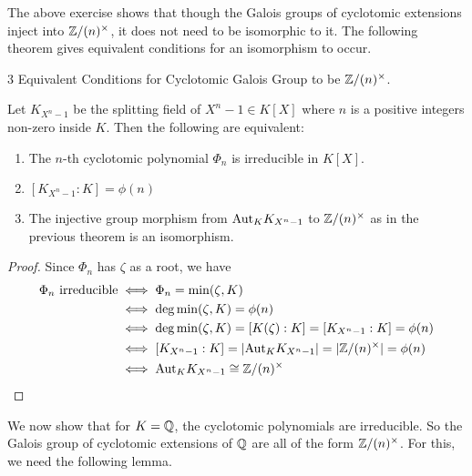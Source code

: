 \documentclass[../book.tex]{subfiles}
\begin{document}
\begin{rmk}
    
    The above exercise shows that
    though the Galois groups of cyclotomic extensions inject into $\mathbb{Z}/(n)^\times$,
    it does not need to be isomorphic to it. 
    The following theorem gives equivalent conditions for an isomorphism to occur.
    
\end{rmk}
\begin{thm} 3 Equivalent Conditions for Cyclotomic Galois Group to be $\mathbb{Z}/(n)^\times$.
    
    Let $K_{X^n - 1}$ be the splitting field of $X^n - 1 \in K[X]$
    where $n$ is a positive integers non-zero inside $K$. 
    Then the following are equivalent: \begin{enumerate}
        \item The $n$-th cyclotomic polynomial $\Phi_n$ is irreducible in $K[X]$.
        \item $[K_{X^n - 1} : K] = \phi(n)$
        \item The injective group morphism 
        from $\mathrm{Aut}_{K}K_{X^n - 1}$ to $\mathbb{Z}/(n)^\times$
        as in the previous theorem is an isomorphism.
    \end{enumerate}
    
\end{thm}
\begin{proof}
    
    Since $\Phi_n$ has $\zeta$ as a root, we have \begin{align*}
        \Phi_n \text{ irreducible} &\iff \Phi_n = \min(\zeta,K) \\
        &\iff \deg\min(\zeta,K) = \phi(n) \\
        &\iff \deg\min(\zeta,K) = [K(\zeta) : K] = [K_{X^n - 1} : K] = \phi(n) \\
        &\iff [K_{X^n - 1} : K] = |\mathrm{Aut}_{K}K_{X^n - 1}| = |\mathbb{Z}/(n)^\times| = \phi(n) \\
        &\iff \mathrm{Aut}_{K}K_{X^n - 1} \cong \mathbb{Z}/(n)^\times
    \end{align*}
    
\end{proof}

We now show that for $K = \mathbb{Q}$, the cyclotomic polynomials are irreducible.
So the Galois group of cyclotomic extensions of $\mathbb{Q}$ 
are all of the form $\mathbb{Z}/(n)^\times$.
For this, we need the following lemma.
\end{document}
